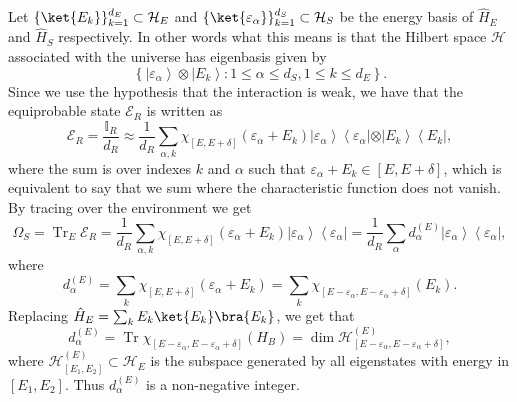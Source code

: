 \indent Let $\{\ket{E_k}\}_{k=1}^{d_E}\subset \mathcal{H}_E$ and $\{\ket{\varepsilon_\alpha}\}_{k=1}^{d_S}\subset \mathcal{H}_S$ be the energy basis of $\hat{H}_E$ and $\hat{H}_S$ respectively. In other words what this means is that the Hilbert space $\mathcal{H}$ associated with the universe has eigenbasis given by 
\begin{equation}
\left\{\left|\varepsilon_{\alpha}\right\rangle \otimes\left|E_{k}\right\rangle: 1 \leq \alpha \leq d_{S}, 1 \leq k \leq d_{E}\right\}.
\end{equation}
\indent Since we use the hypothesis that the interaction is weak, we have that the equiprobable state $\mathcal{E}_R$ is written as
\begin{equation}
\mathcal{E}_{R}=\frac{\mathbb{I}_{R}}{d_{R}} \approx \frac{1}{d_{R}} \sum_{\alpha, k} \chi_{[E, E+\delta]}\left(\varepsilon_{\alpha}+E_{k}\right)\left|\varepsilon_{\alpha}\right\rangle\left\langle\varepsilon_{\alpha}|\otimes| E_{k}\right\rangle\left\langle E_{k}\right|,
\label{CH1:equiprobable_canonical_1}
\end{equation}
\indent where the sum is over indexes $k$ and $\alpha$ such that $\varepsilon_{\alpha}+E_{k}\in [E,E+\delta]$, which is equivalent to say that we sum where the characteristic function does not vanish. By tracing over the environment we get
\begin{equation}
\Omega_{S}=
\operatorname{Tr}_{E} \mathcal{E}_{R}=
\frac{1}{d_{R}} \sum_{\alpha, k} \chi_{[E, E+\delta]}\left(\varepsilon_{\alpha}+E_{k}\right)\left|\varepsilon_{\alpha}\right\rangle\left\langle\varepsilon_{\alpha}\right|=
\frac{1}{d_{R}} \sum_{\alpha} d_{\alpha}^{(E)}\left| \varepsilon_{\alpha}\right\rangle\left\langle\varepsilon_{\alpha}\right|,
\label{CH1:equiprobable_canonical_2}
\end{equation}
where
\begin{equation}
d_{\alpha}^{(E)}=\sum_{k} \chi_{[E, E+\delta]}\left(\varepsilon_{\alpha}+E_{k}\right)=\sum_{k} \chi_{\left[E-\varepsilon_{\alpha}, E-\varepsilon_{\alpha}+\delta\right]}\left(E_{k}\right).
\label{CH1:equiprobable_canonical_3}
\end{equation}
Replacing $\hat{H}_{E}=\sum_{k} E_k\ket{E_k}\bra{E_k}$, we get that
\begin{equation}
d_{\alpha}^{(E)}=\operatorname{Tr} \chi_{\left[E-\varepsilon_{\alpha}, E-\varepsilon_{\alpha}+\delta\right]}\left(H_{B}\right)=\operatorname{dim} \mathcal{H}_{\left[E-\varepsilon_{\alpha}, E-\varepsilon_{\alpha}+\delta\right]}^{(E)},
\label{CH1:equiprobable_canonical_4}
\end{equation}
where $\mathcal{H}^{(E)}_{[E_1,E_2]}\subset \mathcal{H}_{E}$ is the subspace generated by all eigenstates with energy in $[E_1,E_2]$. Thus $d^{(E)}_{\alpha}$ is a non-negative integer.\\

